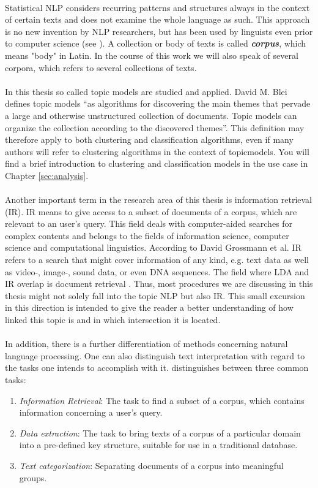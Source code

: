 \documentclass[11pt,a4paper]{article}
\begin{document}
\ \\
Statistical NLP considers recurring patterns and structures always in the context of certain texts and does not examine the whole language as such. This approach is no new invention by NLP researchers, but has been used by linguists even prior to computer science (see \cite{Harris1951}). A collection or body of texts is called \textbf{\textit{corpus}}, which means "body" in Latin. In the course of this work we will also speak of several corpora, which refers to several collections of texts.\\
\ \\
In this thesis so called topic models are studied and applied. David M. Blei defines topic models “as algorithms for discovering the main themes that pervade a large and otherwise unstructured collection of documents. Topic models can organize the collection according to the discovered themes”\cite{Blei2012}. This definition may therefore apply to both clustering and classification algorithms, even if many authors will refer to clustering algorithms in the context of topicmodels. You will find a brief introduction to clustering and classification models in the use case in Chapter \ref{sec:analysis}.\\
\ \\
Another important term in the research area of this thesis is information retrieval (IR). IR means to give access to a subset of documents of a corpus, which are relevant to an user’s query. This field deals with computer-aided searches for complex contents and belongs to the fields of information science, computer science and computational linguistics. According to David Grossmann et al. IR refers to a search that might cover information of any kind, e.g. text data as well as video-, image-, sound data, or even DNA sequences. The field where LDA and IR overlap is document retrieval \cite{Grossmann2004}. Thus, most procedures we are discussing in this thesis might not solely fall into the topic NLP but also IR. This small excursion in this direction is intended to give the reader a better understanding of how linked this topic is and in which intersection it is located. \\
\ \\
In addition, there is a further differentiation of methods concerning natural language processing. One can also distinguish text interpretation with regard to the tasks one intends to accomplish with it. \cite{Jacobs1993} distinguishes between three common tasks:
\begin{enumerate}
	\item \textit{Information Retrieval}: The task to find a subset of a corpus, which contains information concerning a user’s query.

	\item \textit{Data extraction}: The task to bring texts of a corpus of a particular domain into a pre-defined key structure, suitable for use in a traditional database.

	\item \textit{Text categorization}: Separating documents of a corpus into meaningful groups.
\end{enumerate}
\end{document}
